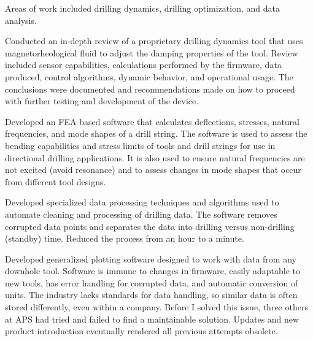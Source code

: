 \documentclass{resume}
\begin{document}
					\noindent Areas of work included drilling dynamics, drilling optimization, and data analysis.
		\begin{bulletedlist}
			
		\item 
					Conducted an in-depth review of a proprietary drilling dynamics tool that uses magnetorheological fluid to adjust the damping properties of the tool.  Review included sensor capabilities, calculations performed by the firmware, data produced, control algorithms, dynamic behavior, and operational usage.  The conclusions were documented and recommendations made on how to proceed with further testing and development of the device.
				
		\item 
					Developed an FEA based software that calculates deflections, stresses, natural frequencies, and mode shapes of a drill string.  The software is used to assess the bending capabilities and stress limits of tools and drill strings for use in directional drilling applications.  It is also used to ensure natural frequencies are not excited (avoid resonance) and to assess changes in mode shapes that occur from different tool designs.
				
		\item 
					Developed specialized data processing techniques and algorithms used to automate cleaning and processing of drilling data.  The software removes corrupted data points and separates the data into drilling versus non-drilling (standby) time.  Reduced the process from an hour to a minute.
				
		\item 
					Developed generalized plotting software designed to work with data from any downhole tool.  Software is immune to changes in firmware, easily adaptable to new tools, has error handling for corrupted data, and automatic conversion of units.  The industry lacks standards for data handling, so similar data is often stored differently, even within a company.  Before I solved this issue, three others at APS had tried and failed to find a maintainable solution.  Updates and new product introduction eventually rendered all previous attempts obsolete.
				
		\end{bulletedlist}
			\vspace*{-12pt}
	\hspace*{0pt}\\ \vspace*{-2pt}
				
\end{document}

